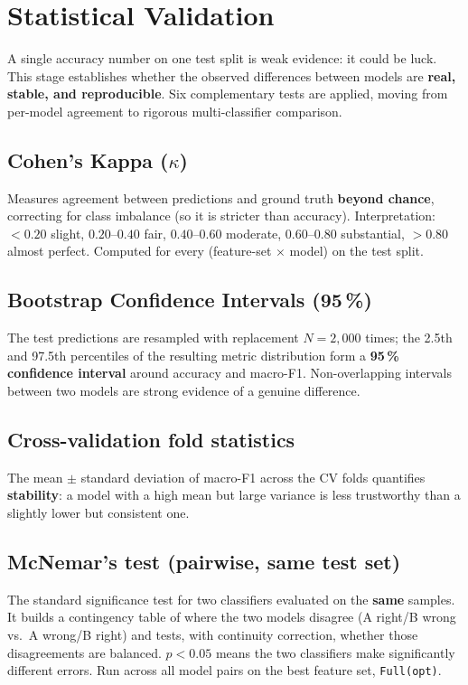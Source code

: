 \section{Statistical Validation}
\label{sec:stats}

A single accuracy number on one test split is weak evidence: it could be luck. This stage establishes
whether the observed differences between models are \textbf{real, stable, and reproducible}. Six
complementary tests are applied, moving from per-model agreement to rigorous multi-classifier
comparison.

\subsection{Cohen's Kappa ($\kappa$)}
Measures agreement between predictions and ground truth \textbf{beyond chance}, correcting for class
imbalance (so it is stricter than accuracy). Interpretation: $<0.20$ slight, $0.20$--$0.40$ fair,
$0.40$--$0.60$ moderate, $0.60$--$0.80$ substantial, $>0.80$ almost perfect. Computed for every
(feature-set $\times$ model) on the test split.

\subsection{Bootstrap Confidence Intervals (95\,\%)}
The test predictions are resampled with replacement $N=2{,}000$ times; the 2.5th and 97.5th
percentiles of the resulting metric distribution form a \textbf{95\,\% confidence interval} around
accuracy and macro-F1. Non-overlapping intervals between two models are strong evidence of a genuine
difference.

\subsection{Cross-validation fold statistics}
The mean $\pm$ standard deviation of macro-F1 across the CV folds quantifies \textbf{stability}: a
model with a high mean but large variance is less trustworthy than a slightly lower but consistent
one.

\subsection{McNemar's test (pairwise, same test set)}
The standard significance test for two classifiers evaluated on the \textbf{same} samples. It builds
a contingency table of where the two models disagree (A right/B wrong vs.\ A wrong/B right) and tests,
with continuity correction, whether those disagreements are balanced. $p<0.05$ means the two
classifiers make significantly different errors. Run across all model pairs on the best feature set,
\texttt{Full(opt)}.

